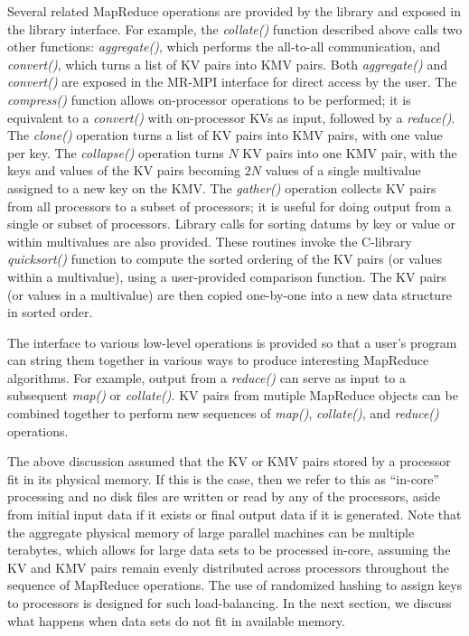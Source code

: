 Several related MapReduce operations are provided by the library and
exposed in the library interface.  For example, the {\it collate()} function
described above
calls two other functions:  {\it aggregate()}, which performs the all-to-all
communication, and {\it convert()}, which turns a list of KV pairs into
KMV pairs.  
Both {\it aggregate()} and {\it convert()} are exposed in the MR-MPI
interface for direct access by the user.
The {\it compress()} function allows on-processor operations to be 
performed; it is equivalent to a {\it convert()} with on-processor KVs as
input, followed by a {\it reduce()}.  
The {\it clone()} operation turns a list of KV pairs into
KMV pairs, with one value per key.  The {\it collapse()} operation turns
$N$ KV pairs into one KMV pair, with the keys and values of the KV
pairs becoming $2N$ values of a single multivalue assigned to a new
key on the KMV.  The {\it gather()} operation collects KV pairs from
all processors to a subset of processors; it is useful for doing
output from a single or subset of processors.  Library calls for
sorting datums by key or value or within multivalues are also
provided.  These routines invoke the C-library {\it quicksort()} function to
compute the sorted ordering of the KV pairs (or values within a
multivalue), using a user-provided comparison function.  The KV pairs
(or values in a multivalue) are then copied one-by-one into a new data
structure in sorted order.

The interface to various low-level operations is provided so
that a user's program can string them together in various ways to
produce interesting MapReduce algorithms.  For example, output from a
{\it reduce()} can serve as input to a subsequent {\it map()} or {\it
collate()}.  KV pairs from mutiple MapReduce objects can be combined
together to perform new sequences of {\it map()}, {\it collate()}, and
{\it reduce()} operations.

The above discussion assumed that the KV or KMV pairs stored by a
processor fit in its physical memory.  If this is the case, then we
refer to this as ``in-core'' processing and no disk files are written
or read by any of the processors, aside from initial input data if it
exists or final output data if it is generated.  Note that the
aggregate physical memory of large parallel machines can be multiple
terabytes, which allows for large data sets to be processed in-core,
assuming the KV and KMV pairs remain evenly distributed across
processors throughout the sequence of MapReduce operations.  The use
of randomized hashing to assign keys to processors is designed for
such load-balancing.  In the next section, we discuss what happens 
when data sets do not fit in available memory.
